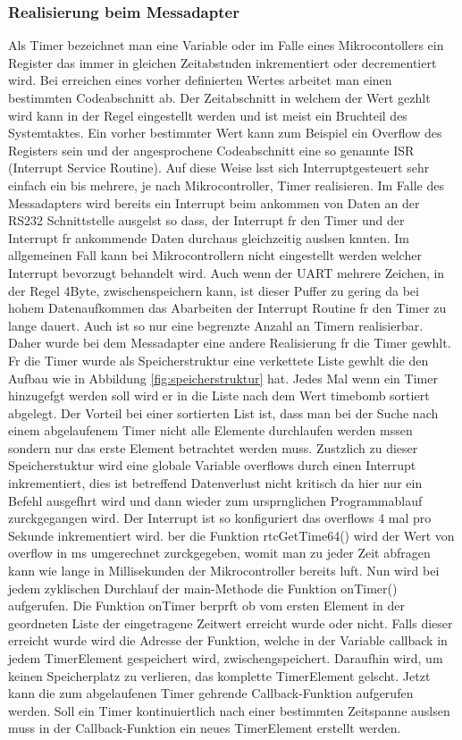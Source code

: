 \documentclass[a4paper]{book}%
\begin{document}
\subsubsection{Realisierung beim Messadapter}
Als Timer bezeichnet man eine Variable oder im Falle eines Mikrocontollers ein Register das immer in gleichen Zeitabstnden inkrementiert oder decrementiert wird. Bei  erreichen eines vorher definierten Wertes arbeitet man einen bestimmten Codeabschnitt ab. Der Zeitabschnitt in welchem der Wert gezhlt wird kann in der Regel eingestellt werden und ist meist ein Bruchteil des Systemtaktes. Ein vorher bestimmter Wert kann zum Beispiel ein Overflow des Registers sein und der angesprochene Codeabschnitt eine so genannte ISR (Interrupt Service Routine). Auf diese Weise lsst sich Interruptgesteuert sehr einfach ein bis mehrere, je nach Mikrocontroller, Timer realisieren. Im Falle des Messadapters wird bereits ein Interrupt beim ankommen von Daten an der RS232 Schnittstelle ausgelst so dass, der Interrupt fr  den Timer und der Interrupt fr ankommende Daten durchaus gleichzeitig auslsen knnten. Im allgemeinen Fall kann bei Mikrocontrollern nicht eingestellt werden welcher Interrupt bevorzugt behandelt wird. Auch wenn der UART mehrere Zeichen, in der Regel 4Byte, zwischenspeichern kann, ist dieser Puffer zu gering  da bei hohem Datenaufkommen das Abarbeiten der Interrupt Routine fr den Timer zu lange dauert. Auch ist so nur eine begrenzte Anzahl an Timern realisierbar. Daher wurde bei dem Messadapter eine andere Realisierung fr die Timer gewhlt. Fr die Timer wurde als Speicherstruktur eine verkettete Liste gewhlt die den Aufbau wie in Abbildung \ref{fig:speicherstruktur} hat. Jedes Mal wenn ein Timer hinzugefgt werden soll wird er in die Liste nach dem Wert timebomb sortiert abgelegt.  Der Vorteil bei einer sortierten List ist, dass man bei der Suche nach einem abgelaufenem Timer nicht alle Elemente durchlaufen werden mssen sondern nur das erste Element betrachtet werden muss. Zustzlich zu dieser Speicherstuktur wird eine globale Variable overflows durch einen Interrupt inkrementiert, dies ist betreffend Datenverlust nicht kritisch da hier nur ein Befehl ausgefhrt wird und dann wieder zum ursprnglichen Programmablauf zurckgegangen wird. Der Interrupt ist so konfiguriert das overflows 4 mal pro Sekunde inkrementiert wird. ber die Funktion rtcGetTime64() wird  der Wert von overflow in ms umgerechnet zurckgegeben, womit man zu jeder Zeit abfragen kann wie lange in Millisekunden der Mikrocontroller bereits luft. Nun wird bei jedem zyklischen Durchlauf der main-Methode die Funktion onTimer() aufgerufen. Die Funktion onTimer berprft ob vom ersten Element in der geordneten Liste der eingetragene Zeitwert erreicht wurde oder nicht. Falls dieser erreicht wurde wird die Adresse der Funktion, welche in der Variable callback in jedem TimerElement gespeichert wird, zwischengspeichert. Daraufhin wird, um keinen Speicherplatz zu verlieren, das komplette TimerElement gelscht. Jetzt kann die zum abgelaufenen Timer gehrende Callback-Funktion aufgerufen werden. Soll ein Timer kontinuiertlich nach einer bestimmten Zeitspanne auslsen muss in der Callback-Funktion ein neues TimerElement erstellt werden.
\end{document}
